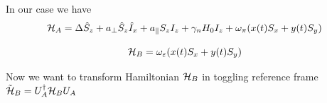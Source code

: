 \documentclass[
  onecolumn,
  aps,
  amsmath,
  amssymb,
  superscriptaddress,
  nofootinbib,
  floatfix
]{revtex4-2}
\newcommand{\0}{^{\phantom{\dagger}}}
\begin{document}
In our case we have
\begin{equation}
{\cal H}_{A}=\Delta\hat{S}_{z}+a_{\perp}\hat{S}_{z}\hat{I}_{x}+a_{\parallel}S_{z}I_{z}+\gamma_{n}H_{0}I_{z}+\omega_{\pi}(x(t)S_{x}+y(t)S_{y})
\end{equation}

\begin{equation}
{\cal H}_{B}=\omega_{\varepsilon}(x(t)S_{x}+y(t)S_{y})
\end{equation}

Now we want to transform Hamiltonian ${\cal H}_{B}$ in toggling reference
frame $\tilde{{\cal H}}_{B}=U_{A}^{\dagger}{\cal H}_{B}U_{A}$
\end{document}

